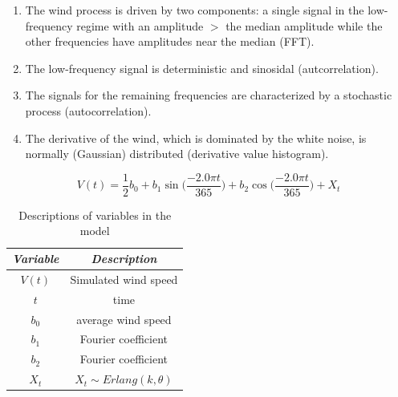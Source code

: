 \documentclass[11pt, letterpaper]{article}
\begin{document}
\begin{enumerate}
\item The wind process is driven by two components: a single signal in the low-frequency regime with an amplitude $>$ the median amplitude while the other frequencies have amplitudes near the median (FFT).
\item The low-frequency signal is deterministic and sinosidal (autcorrelation).
\item The signals for the remaining frequencies are characterized by a stochastic process (autocorrelation).
\item The derivative of the wind, which is dominated by the white noise, is normally (Gaussian) distributed (derivative value histogram).
\end{enumerate}

\begin{equation}
V(t) = \frac{1}{2}b_0 + b_1 \sin\Big(\frac{-2.0 \pi t}{365}\Big) + b_2 \cos\Big(\frac{-2.0 \pi t}{365}\Big) + X_t
\end{equation}

\begin{table}[H]
  \centering
  \begin{tabular}{c c} \hline
  \emph{Variable} & \emph{Description}\\ \hline
  $V(t)$ & Simulated wind speed \\ \hline
  $t$ & time \\ \hline
  $b_0$ & average wind speed \\ \hline
  $b_1$ & Fourier coefficient \\ \hline
  $b_2$ & Fourier coefficient \\ \hline
  $X_t$ & $X_t \sim Erlang(k, \theta)$ \\ \hline 
  \end{tabular}
  \caption{Descriptions of variables in the model}
  \label{tab:analysis-ft-values}
\end{table}
\end{document}
